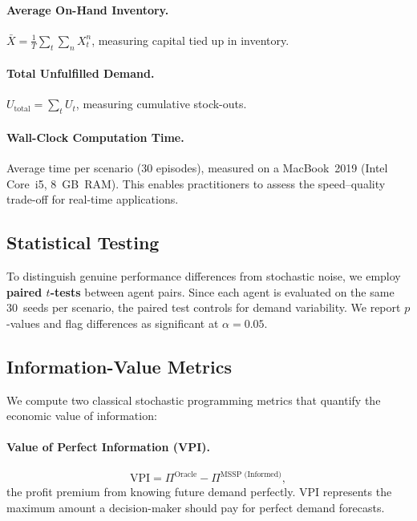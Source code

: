 \paragraph{Average On-Hand Inventory.}
$\bar{X} = \frac{1}{T} \sum_{t} \sum_{n} X_t^n$, measuring capital
tied up in inventory.

\paragraph{Total Unfulfilled Demand.}
$U_{\text{total}} = \sum_{t} U_t$, measuring cumulative stock-outs.

\paragraph{Wall-Clock Computation Time.}
Average time per scenario (30 episodes), measured on a MacBook~2019
(Intel Core~i5, 8~GB~RAM). This enables practitioners to assess the
speed--quality trade-off for real-time applications.

\subsection{Statistical Testing}

To distinguish genuine performance differences from stochastic noise,
we employ \textbf{paired $t$-tests} between agent pairs. Since each
agent is evaluated on the same 30~seeds per scenario, the paired test
controls for demand variability. We report $p$-values and flag
differences as significant at $\alpha = 0.05$.

\subsection{Information-Value Metrics}

We compute two classical stochastic programming metrics that quantify
the economic value of information:

\paragraph{Value of Perfect Information (VPI).}
\begin{equation}\label{eq:vpi}
  \text{VPI} = \Pi^{\text{Oracle}} - \Pi^{\text{MSSP (Informed)}},
\end{equation}
the profit premium from knowing future demand perfectly. VPI
represents the maximum amount a decision-maker should pay for perfect
demand forecasts.

